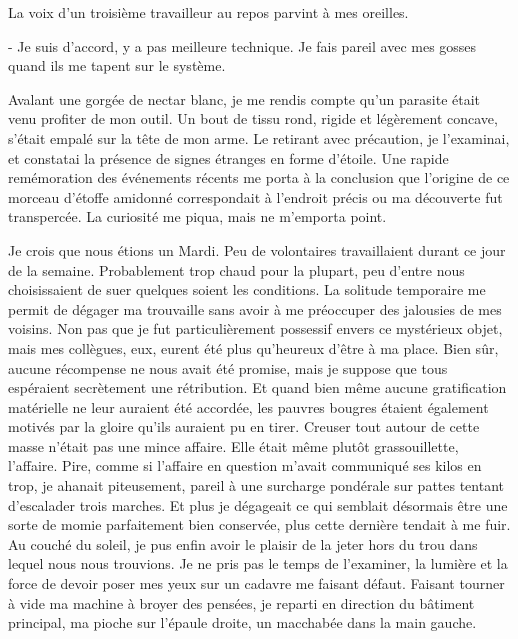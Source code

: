 \documentclass[12pt,a4paper,article]{memoir} %
\begin{document}
La voix d'un troisi\`{e}me travailleur au repos parvint \`{a} mes oreilles.

	- Je suis d'accord, y a pas meilleure technique.
	Je fais pareil avec mes gosses quand ils me tapent sur le syst\`{e}me.

Avalant une gorg\'{e}e de nectar blanc, je me rendis compte qu'un parasite \'{e}tait venu profiter de mon outil. Un bout de tissu rond, rigide et l\'{e}g\`{e}rement
concave, s'\'{e}tait empal\'{e} sur la t\^{e}te de mon arme. Le retirant avec pr\'{e}caution, je l'examinai, et constatai la pr\'{e}sence de signes \'{e}tranges en forme d'\'{e}toile. Une rapide rem\'{e}moration des \'{e}v\'{e}nements r\'{e}cents me porta \`{a} la conclusion que l'origine de ce morceau d'\'{e}toffe amidonn\'{e} correspondait \`{a} l'endroit pr\'{e}cis ou ma d\'{e}couverte fut transperc\'{e}e. La curiosit\'{e} me piqua, mais ne m'emporta point.


Je crois que nous \'{e}tions un Mardi. Peu de volontaires travaillaient durant ce jour de la semaine. Probablement trop chaud pour la plupart, peu d'entre nous choisissaient de suer quelques soient les conditions. La solitude temporaire me permit de d\'{e}gager ma trouvaille sans avoir \`{a} me pr\'{e}occuper des jalousies de mes voisins. Non pas que je fut particuli\`{e}rement possessif envers ce myst\'{e}rieux objet, mais mes coll\`{e}gues, eux, eurent \'{e}t\'{e} plus qu'heureux d'\^{e}tre \`{a} ma place. Bien s\^{u}r, aucune r\'{e}compense ne nous avait \'{e}t\'{e} promise, mais je suppose que tous esp\'{e}raient secr\`{e}tement une r\'{e}tribution. Et quand bien m\^{e}me aucune gratification mat\'{e}rielle ne leur auraient \'{e}t\'{e} accord\'{e}e, les pauvres bougres \'{e}taient \'{e}galement motiv\'{e}s par la gloire qu'ils auraient pu en tirer.
Creuser tout autour de cette masse n'\'{e}tait pas une mince affaire. Elle \'{e}tait m\^{e}me plut\^{o}t grassouillette, l'affaire. Pire, comme si l'affaire en question m'avait communiqu\'{e} ses kilos en trop, je ahanait piteusement, pareil \`{a} une surcharge pond\'{e}rale sur pattes tentant d'escalader trois marches. Et plus je d\'{e}gageait ce qui semblait d\'{e}sormais \^{e}tre une sorte de momie parfaitement bien conserv\'{e}e, plus cette derni\`{e}re tendait \`{a} me fuir.
Au couch\'{e} du soleil, je pus enfin avoir le plaisir de la jeter hors du trou dans lequel nous nous trouvions. Je ne pris pas le temps de l'examiner, la lumi\`{e}re et la force de devoir poser mes yeux sur un cadavre me faisant d\'{e}faut. Faisant tourner \`{a} vide ma machine \`{a} broyer des pens\'{e}es, je reparti en direction du b\^{a}timent principal, ma pioche sur l'\'{e}paule droite, un macchab\'{e}e dans la main gauche.
\end{document}
